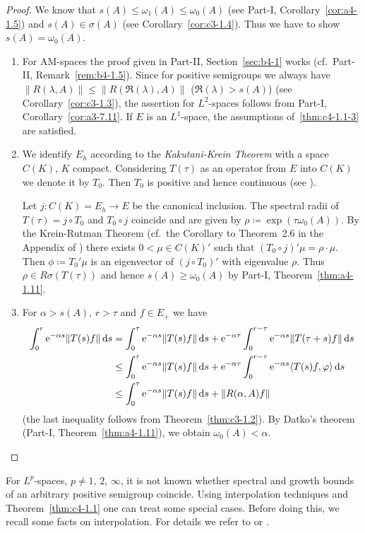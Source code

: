 \begin{proof}
We know that $s(A) \leq \omega_{1}(A) \leq \omega_{0}(A)$ (see Part-I, Corollary~\ref{cor:a4-1.5}) and $s(A) \in \sigma(A)$ (see Corollary~\ref{cor:c3-1.4}).
Thus we have to show $s(A) = \omega_{0}(A)$.
\begin{enumerate}[\upshape (i), wide, labelindent=.25em]
\item 
For AM-spaces the proof given in Part-II, Section~\ref{sec:b4-1} works (cf.\ Part-II, Remark~\ref{rem:b4-1.5}).
Since for positive semigroups we always have $\|R(\lambda,A)\| \leq \|R(\Re(\lambda), A)\|$ ($\Re(\lambda) > s(A)$) (see   Corollary~\ref{cor:c3-1.3}), the assertion for $L^{2}$-spaces follows from Part-I, Corollary~\ref{cor:a3-7.11}.
If\/ $E$ is an $L^{1}$-space, the assumptions of~\ref{thm:c4-1.1-3} are satisfied.

\item 
We identify $E_{h}$ according to the \emph{Kakutani-Krein Theorem} with a space $C(K)$, $K$ compact.
Considering $T(\tau)$ as an operator from $E$ into $C(K)$ we denote it by $T_{0}$.
Then $T_{0}$ is positive and hence continuous (see \textcite[Theorem~5.3]{schaefer:1974}).

Let $j \colon C(K) = E_{h} \to E$ be the canonical inclusion.
The spectral radii of\/ $T(\tau) = j \circ T_{0}$ and $T_{0} \circ j$ coincide and are given by $\rho \coloneq  \exp(\tau \omega_{0}(A))$.
By the Krein-Rutman Theorem (cf.\ the Corollary to Theorem~2.6 in the Appendix of \textcite{schaefer:1966}) there exists $0 < \mu \in C(K)'$ such that $(T_{0} \circ j)'\mu = \rho \cdot \mu$.
Then $\phi \coloneq  T_{0}'\mu$ is an eigenvector of\/ $(j \circ T_{0})'$ with eigenvalue $\rho$.
Thus $\rho \in R\sigma(T(\tau))$ and hence $s(A) \geq \omega_{0}(A)$ by Part-I, Theorem~\ref{thm:a4-1.11}.

\item
For $\alpha > s(A)$, $r > \tau$ and $f \in E_{+}$ we have
\begin{align*}
\int_{0}^{r} \eu^{-\alpha s}\|T(s)f\| \ds &= \int_{0}^{\tau} \eu^{-\alpha s}\|T(s)f\| \ds + \eu^{-\alpha \tau}\int_{0}^{r-\tau} \eu^{-\alpha s}\|T(\tau+s)f\| \ds \\
&\leq \int_{0}^{\tau} \eu^{-\alpha s}\|T(s)f\| \ds + \eu^{-\alpha \tau}\int_{0}^{r-\tau} \eu^{-\alpha s}\langle T(s)f,\phi \rangle \ds \\
&\leq \int_{0}^{\tau} \eu^{-\alpha s}\|T(s)f\| \ds + \|R(\alpha,A)f\|
\end{align*}
(the last inequality follows from Theorem~\ref{thm:c3-1.2}).
By Datko's theorem (Part-I, Theorem~\ref{thm:a4-1.11}), we obtain $\omega_{0}(A) < \alpha$.
\qedhere
\end{enumerate}
\end{proof}
For $L^{p}$-spaces, $p \neq 1$, $2$, $\infty$, it is not known whether spectral and growth bounds of an arbitrary positive semigroup coincide.
Using interpolation techniques and  Theorem~\ref{thm:c4-1.1}  one can treat some special cases.
Before doing this, we recall some facts on interpolation.
For details we refer to 
\textcite[VI.10]{dunfordschwartz:1958} or \textcite[IX.4]{reedsimon:1975}.

